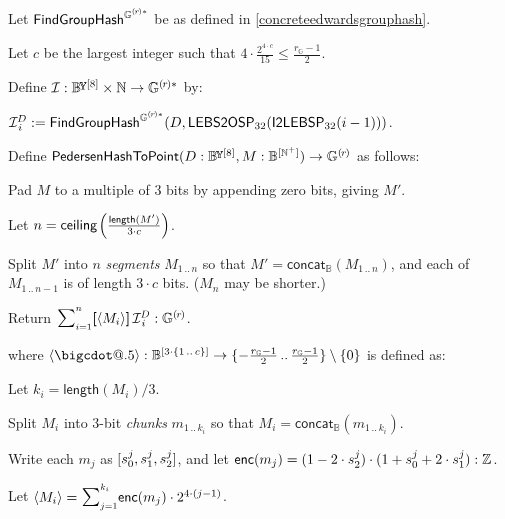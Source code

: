 \documentclass{article}
\makeatletter
\newcommand*\bigcdot{\mathpalette\bigcdot@{.5}}
\newcommand*\bigcdot@[2]{\mathbin{\vcenter{\hbox{\scalebox{#2}{$\m@th#1\bullet$}}}}}
\newcommand{\crossref}[1]{\autoref{#1}}
\newcommand{\typecolon}{:}
\newcommand{\bit}{\mathbb{B}}
\newcommand{\overlap}[2]{\rlap{#2}\hspace{#1}{#2}}
\newcommand{\byte}{\mathbb{B}\kern -0.1em\raisebox{0.48ex}{\overlap{0.0001em}{\scalebox{0.7}{$\mathbb{Y}$}}}}
\newcommand{\Nat}{\mathbb{N}}
\newcommand{\PosInt}{\mathbb{N}^+}
\newcommand{\Int}{\mathbb{Z}}
\newcommand{\typeexp}[2]{{#1}\vphantom{)}^{[{#2}]}}
\newcommand{\bitseq}[1]{\typeexp{\bit}{#1}}
\newcommand{\byteseq}[1]{\typeexp{\byte}{#1}}
\newcommand{\concatbits}{\mathsf{concat}_\bit}
\newcommand{\length}{\mathsf{length}}
\newcommand{\setof}[1]{\{{#1}\}}
\newcommand{\barerange}[2]{{{#1}\,..\,{#2}}}
\newcommand{\range}[2]{\setof{\barerange{#1}{#2}}}
\newcommand{\rangenozero}[2]{\range{#1}{#2} \setminus \setof{0}}
\newcommand{\ceiling}[1]{\mathsf{ceiling}\kern-0.06em\left({#1}\right)}
\newcommand{\sop}[3]{\!\scalebox{0.89}{$\scalebox{1.404}{$\strut#3$}_{#1}^{#2}$}}
\newcommand{\ssum}[2]{\sop{#1}{#2}{\sum}}
\newcommand{\mult}{\cdot}
\newcommand{\scalarmult}[2]{\boldsymbol{[}{#1}\boldsymbol{]}\,{#2}}
\newcommand{\paramdot}{\bigcdot}
\newcommand{\enc}{\mathsf{enc}}
\newcommand{\subgroupr}{(\kern-0.075emr\kern-0.075em)}
\newcommand{\FindGroupHash}{\mathsf{FindGroupHash}}
\newcommand{\ParamG}[1]{{{#1}_\mathbb{G}}}
\newcommand{\GroupG}[1]{\mathbb{G}_{#1}}
\newcommand{\SubgroupG}[1]{\GroupG{#1}^{\subgroupr}}
\newcommand{\SubgroupGstar}[1]{\GroupG{#1}^{\subgroupr\ast}}
\newcommand{\FindGroupGHash}{\FindGroupHash^{\SubgroupGstar{}}}
\newcommand{\ItoLEBSP}[1]{\mathsf{I2LEBSP}_{#1}}
\newcommand{\LEBStoOSP}[1]{\mathsf{LEBS2OSP}_{#1}}
\newcommand{\PedersenGenAlg}{\mathcal{I}}
\newcommand{\PedersenGen}[2]{\PedersenGenAlg^{\kern -0.05em{#1}}_{\kern 0.1em {#2}}}
\newcommand{\PedersenEncode}[1]{\langle{#1}\rangle}
\newcommand{\PedersenHashToPoint}{\mathsf{PedersenHashToPoint}}
\makeatother
\begin{document}
Let $\FindGroupGHash$ be as defined in \crossref{concreteedwardsgrouphash}.

Let $c$ be the largest integer such that $4 \mult \frac{2^{4 \mult c}}{15} \leq \frac{\ParamG{r}-1}{2}$.

Define $\PedersenGenAlg \typecolon \byteseq{8} \times \Nat \rightarrow \SubgroupGstar{}$ by:

\begin{formulae}
  \item $\PedersenGen{D}{i} := \FindGroupGHash(D, \LEBStoOSP{32}(\ItoLEBSP{32}(i-1)))$.
\end{formulae}

\newcommand{\sj}[1]{s^{\kern 0.02em j}_{#1}}

Define $\PedersenHashToPoint(D \typecolon \byteseq{8}, M \typecolon \bitseq{\PosInt}) \rightarrow \SubgroupG{}$ as follows:

\begin{algorithm}
  \item Pad $M$ to a multiple of $3$ bits by appending zero bits, giving $M'$.
  \item Let $n = \ceiling{\frac{\length(M')}{3 \mult c}}$.
  \item Split $M'$ into $n$ \emph{segments} $M_\barerange{1}{n}$
        so that $M' = \concatbits(M_\barerange{1}{n})$, and
        each of $M_\barerange{1}{n-1}$ is of length $3 \mult c$ bits.
        ($M_n$ may be shorter.)
  \item Return $\ssum{i=1}{n} \scalarmult{\PedersenEncode{M_i}}{\PedersenGen{D}{i}} \typecolon \SubgroupG{}$.
\end{algorithm}

where
$\PedersenEncode{\paramdot} \typecolon \bitseq{3 \mult \range{1}{c}} \rightarrow
   \rangenozero{-\frac{\ParamG{r}-1}{2}}{\frac{\ParamG{r}-1}{2}}$ is defined as:

\begin{algorithm}
  \item Let $k_i = \length(M_i)/3$.
  \item Split $M_i$ into $3$-bit \emph{chunks} $m_\barerange{1}{k_i}$
        so that $M_i = \concatbits(m_\barerange{1}{k_i})$.
  \item Write each $m_j$ as $[\sj{0}, \sj{1}, \sj{2}]$, and let
        $\enc(m_j) = (1 - 2 \mult \sj{2}) \mult (1 + \sj{0} + 2 \mult \sj{1}) \typecolon \Int$.
  \item Let $\PedersenEncode{M_i} = \ssum{j=1}{k_i} \enc(m_j) \mult 2^{4 \mult (j-1)}$.
\end{algorithm}
\end{document}
